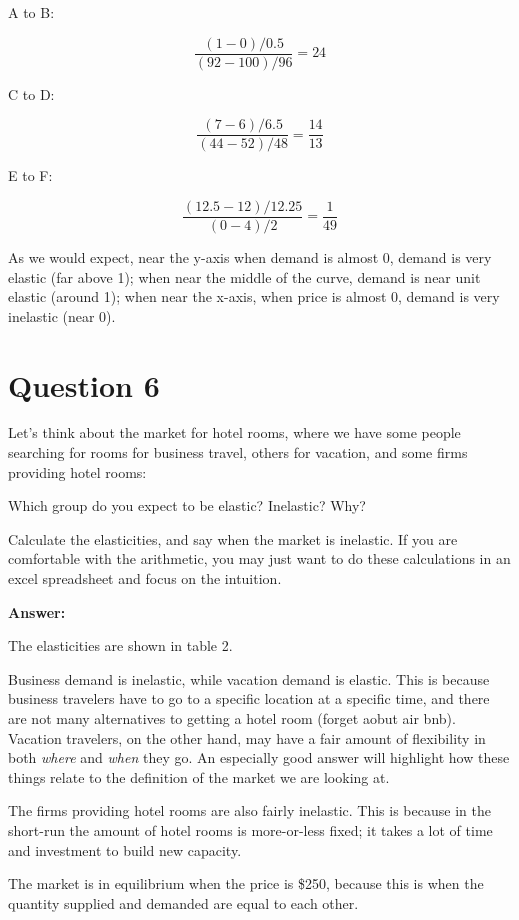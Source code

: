 \documentclass[12pt]{article}
\begin{document}
\vspace{2mm}

A to B:

$$ \dfrac{(1-0)/0.5}{(92-100)/96} = 24 $$

\vspace{2mm}

C to D:

$$ \dfrac{(7-6)/6.5}{(44-52)/48} = \dfrac{14}{13} $$

\vspace{2mm}

E to F:

$$ \dfrac{(12.5-12)/12.25}{(0-4)/2} = \dfrac{1}{49} $$

As we would expect, near the y-axis when demand is almost 0, demand is very elastic (far above 1); when near the middle of the curve, demand is near unit elastic (around 1); when near the x-axis, when price is almost 0, demand is very inelastic (near 0).

\section*{Question 6}
Let's think about the market for hotel rooms, where we have some people searching for rooms for business travel, others for vacation, and some firms providing hotel rooms:



Which group do you expect to be elastic? Inelastic? Why?

\vspace{2mm}

Calculate the elasticities, and say when the market is inelastic. If you are comfortable with the arithmetic, you may just want to do these calculations in an excel spreadsheet and focus on the intuition.

\vspace{2mm}

\textbf{Answer:}

\vspace{2mm}

The elasticities are shown in table 2.



Business demand is inelastic, while vacation demand is elastic. This is because business travelers have to go to a specific location at a specific time, and there are not many alternatives to getting a hotel room (forget aobut air bnb). Vacation travelers, on the other hand, may have a fair amount of flexibility in both \textit{where} and \textit{when} they go. An especially good answer will highlight how these things relate to the definition of the market we are looking at.

\vspace{2mm}

The firms providing hotel rooms are also fairly inelastic. This is because in the short-run the amount of hotel rooms is more-or-less fixed; it takes a lot of time and investment to build new capacity.

\vspace{2mm}

The market is in equilibrium when the price is \$250, because this is when the quantity supplied and demanded are equal to each other.
\end{document}
